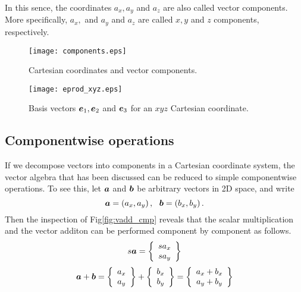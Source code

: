 \documentclass[10pt,a4j]{article}
\begin{document}
In this sence, the coordinates $a_x, a_y$ and $a_z$ are also called vector components. 
More specifically, $a_x, $ and $a_y$ and $a_z$ are called $x, y$ and $z$ components, 
respectively.
\begin{figure}[h]
	\begin{center}
	\texttt{[image: components.eps]} 
	\end{center}
	\caption{Cartesian coordinates and vector components.} 
	\label{fig:fig1_7}
\end{figure}
\begin{figure}[h]
	\begin{center}
	\texttt{[image: eprod\_xyz.eps]} 
	\end{center}
	\caption{Basis vectors $\mbox{\boldmath $e$}_1, \mbox{\boldmath $e$}_2$ and $\mbox{\boldmath $e$}_3$ for an $xyz$ Cartesian coordinate.} 
	\label{fig:fig1_9}
\end{figure}
\subsection{Componentwise operations}
If we decompose vectors into components in a Cartesian coordinate system, 
the vector algebra that has been discussed can be reduced to simple componentwise 
operations. To see this, let $\mbox{\boldmath $a$}$ and $\mbox{\boldmath $b$}$ be arbitrary vectors in 2D space, 
and write 
\begin{equation}
	\fat{a}=\left(a_x, a_y \right), \ \ 
	\fat{b}=\left(b_x, b_y \right).
	\label{eqn:}
\end{equation}
Then the inspection of Fig\ref{fig:vadd_cmp} reveals that  
the scalar multiplication and the vector additon can be 
performed component by component as follows.
\begin{equation}
	s\mbox{\boldmath $a$}
	=
	\left\{
		\begin{array}{c}
			sa_x \\
			sa_y 
		\end{array}
	\right\}
	\label{eqn:}
\end{equation}
\begin{equation}
	\mbox{\boldmath $a$}
	+
	\mbox{\boldmath $b$}
	=
	\left\{
		\begin{array}{c}
			a_x \\
			a_y 
		\end{array}
	\right\}
	+
	\left\{
		\begin{array}{c}
			b_x \\
			b_y 
		\end{array}
	\right\}
	=
	\left\{
		\begin{array}{c}
			a_x+b_x \\
			a_y+b_y
		\end{array}
	\right\}
	\label{eqn:}
\end{equation}
\end{document}
